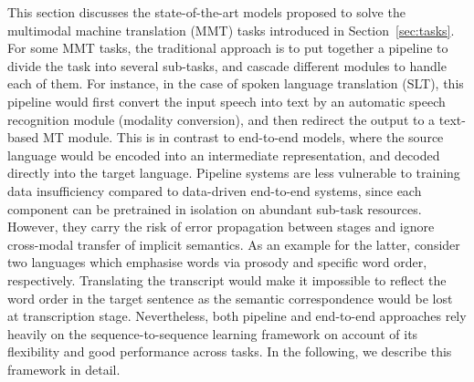 \documentclass{svjour3}
\begin{document}
    This section discusses the state-of-the-art models proposed to solve the multimodal machine translation (MMT) tasks introduced in Section~\ref{sec:tasks}.
For some MMT tasks, the traditional approach is to put together a pipeline to divide the task into several sub-tasks, and cascade different modules to handle each of them.
For instance, in the case of spoken language translation (SLT), this pipeline would first convert the input speech into text by an automatic speech recognition module (modality conversion), and then redirect the output to a text-based MT module. This is in contrast to end-to-end models, where the source language would be encoded into an intermediate representation, and decoded directly into the target language. Pipeline systems are less vulnerable to training data insufficiency compared to data-driven end-to-end systems, since each component can be pretrained in isolation on abundant sub-task resources. However, they carry the risk of error propagation between stages and ignore cross-modal transfer of implicit semantics. As an example for the latter, consider two languages which emphasise words via prosody and specific word order, respectively. Translating the transcript would make it impossible to reflect the word order in the target sentence as the semantic correspondence would be lost at transcription stage.
Nevertheless, both pipeline and end-to-end approaches rely heavily on the sequence-to-sequence learning framework on account of its flexibility and good performance across tasks. In the following, we describe this framework in detail.
\end{document}
